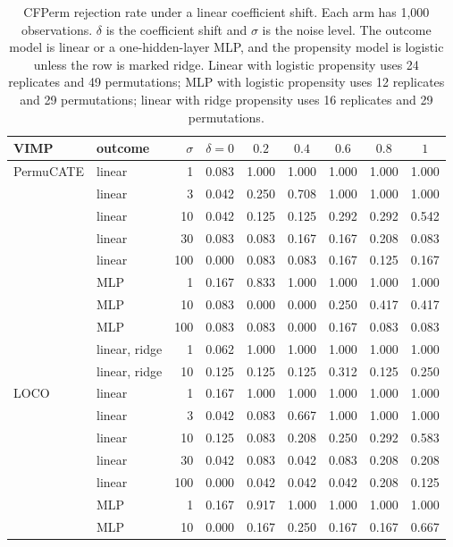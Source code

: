 \documentclass{article}
\begin{document}
\begin{table}[ht]
\centering
\small
\caption{CFPerm rejection rate under a linear coefficient shift.
Each arm has 1{,}000 observations.
$\delta$ is the coefficient shift and $\sigma$ is the noise level.
The outcome model is linear or a one-hidden-layer MLP, and the propensity model is logistic unless the row is marked ridge.
Linear with logistic propensity uses 24 replicates and 49 permutations;
MLP with logistic propensity uses 12 replicates and 29 permutations;
linear with ridge propensity uses 16 replicates and 29 permutations.}
\label{tab:outcome-power}
\begin{tabular}{llrcccccc}
\toprule
VIMP & outcome & $\sigma$ & $\delta=0$ & $0.2$ & $0.4$ & $0.6$ & $0.8$ & $1$ \\
\midrule
PermuCATE & linear & 1 & 0.083 & 1.000 & 1.000 & 1.000 & 1.000 & 1.000 \\
 & linear & 3 & 0.042 & 0.250 & 0.708 & 1.000 & 1.000 & 1.000 \\
 & linear & 10 & 0.042 & 0.125 & 0.125 & 0.292 & 0.292 & 0.542 \\
 & linear & 30 & 0.083 & 0.083 & 0.167 & 0.167 & 0.208 & 0.083 \\
 & linear & 100 & 0.000 & 0.083 & 0.083 & 0.167 & 0.125 & 0.167 \\
 & MLP & 1 & 0.167 & 0.833 & 1.000 & 1.000 & 1.000 & 1.000 \\
 & MLP & 10 & 0.083 & 0.000 & 0.000 & 0.250 & 0.417 & 0.417 \\
 & MLP & 100 & 0.083 & 0.083 & 0.000 & 0.167 & 0.083 & 0.083 \\
 & linear, ridge & 1 & 0.062 & 1.000 & 1.000 & 1.000 & 1.000 & 1.000 \\
 & linear, ridge & 10 & 0.125 & 0.125 & 0.125 & 0.312 & 0.125 & 0.250 \\
\midrule
LOCO & linear & 1 & 0.167 & 1.000 & 1.000 & 1.000 & 1.000 & 1.000 \\
 & linear & 3 & 0.042 & 0.083 & 0.667 & 1.000 & 1.000 & 1.000 \\
 & linear & 10 & 0.125 & 0.083 & 0.208 & 0.250 & 0.292 & 0.583 \\
 & linear & 30 & 0.042 & 0.083 & 0.042 & 0.083 & 0.208 & 0.208 \\
 & linear & 100 & 0.000 & 0.042 & 0.042 & 0.042 & 0.208 & 0.125 \\
 & MLP & 1 & 0.167 & 0.917 & 1.000 & 1.000 & 1.000 & 1.000 \\
 & MLP & 10 & 0.000 & 0.167 & 0.250 & 0.167 & 0.167 & 0.667 \\

\end{tabular}
\end{table}
\end{document}
